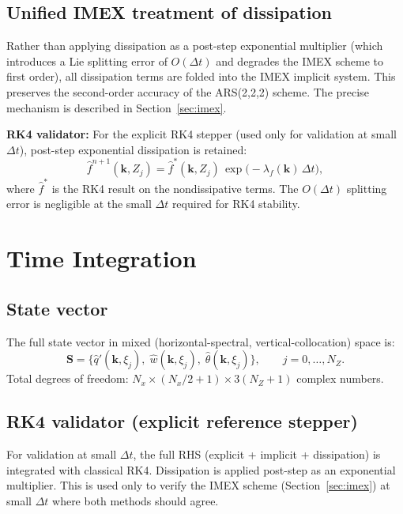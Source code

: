 \documentclass[11pt]{article}
\newcommand{\hhat}[1]{\widehat{#1}}
\begin{document}
\subsection{Unified IMEX treatment of dissipation}
\label{sec:diss_imex}

Rather than applying dissipation as a post-step exponential multiplier (which introduces a Lie splitting error of $O(\Delta t)$ and degrades the IMEX scheme to first order), all dissipation terms are folded into the IMEX implicit system. This preserves the second-order accuracy of the ARS(2,2,2) scheme. The precise mechanism is described in Section~\ref{sec:imex}.

\noindent\textbf{RK4 validator:} For the explicit RK4 stepper (used only for validation at small $\Delta t$), post-step exponential dissipation is retained:
\begin{equation}
\hhat{f}^{n+1}(\bm{k},Z_j) = \hhat{f}^*(\bm{k},Z_j)\,\exp\!\big(-\lambda_f(\bm{k})\,\Delta t\big),
\end{equation}
where $\hhat{f}^*$ is the RK4 result on the nondissipative terms. The $O(\Delta t)$ splitting error is negligible at the small $\Delta t$ required for RK4 stability.


\section{Time Integration}
\label{sec:timestepping}

\subsection{State vector}

The full state vector in mixed (horizontal-spectral, vertical-collocation) space is:
\begin{equation}
\bm{S} = \Big\{\hhat{q}'(\bm{k}, \xi_j),\; \hhat{w}(\bm{k}, \xi_j),\; \hhat\theta(\bm{k}, \xi_j)\Big\}, \qquad j = 0, \ldots, N_Z.
\end{equation}
Total degrees of freedom: $N_x \times (N_x/2+1) \times 3(N_Z + 1)$ complex numbers.


\subsection{RK4 validator (explicit reference stepper)}

For validation at small $\Delta t$, the full RHS (explicit + implicit + dissipation) is integrated with classical RK4. Dissipation is applied post-step as an exponential multiplier. This is used only to verify the IMEX scheme (Section~\ref{sec:imex}) at small $\Delta t$ where both methods should agree.
\end{document}
